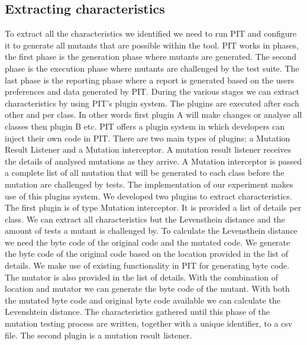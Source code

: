 \documentclass[../../main]{subfiles}
\begin{document}
\subsection{Extracting characteristics}
To extract all the characteristics we identified we need to run PIT and configure it to generate all mutants that are possible within the tool. 
PIT works in phases, the first phase is the generation phase where mutants are generated.
The second phase is the execution phase where mutants are challenged by the test suite.
The last phase is the reporting phase where a report is generated based on the users preferences and data generated by PIT.
During the various stages we can extract characteristics by using PIT's plugin system.
The plugins are executed after each other and per class.
In other words first plugin A will make changes or analyse all classes then plugin B etc.
\newline
PIT offers a plugin system in which developers can inject their own code in PIT\cite{pitestPlugin}.
There are two main types of plugins; a Mutation Result Listener and a Mutation interceptor\cite{pitestPlugin}.
A mutation result listener receives the details of analysed mutations as they arrive\cite{pitestPlugin}.
A Mutation interceptor is passed a complete list of all mutation that will be generated to each class before the mutation are challenged by tests\cite{pitestPlugin}.
The implementation of our experiment makes use of this plugins system.
\newline
We developed two plugins to extract characteristics.
The first plugin is of type Mutation interceptor.
It is provided a list of details per class. 
We can extract all characteristics but the Levensthein distance and the amount of tests a mutant is challenged by.
To calculate the Levensthein distance we need the byte code of the original code and the mutated code.
We generate the byte code of the original code based on the location provided in the list of details.
We make use of existing functionality in PIT for generating byte code.
The mutator is also provided in the list of details.
With the combination of location and mutator we can generate the byte code of the mutant.
With both the mutated byte code and original byte code available we can calculate the Levenshtein distance.
\newline
The characteristics gathered until this phase of the mutation testing process are written, together with a unique identifier, to a \acrshort{csv} file.
\newline
The second plugin is a mutation result listener. 
\end{document}
